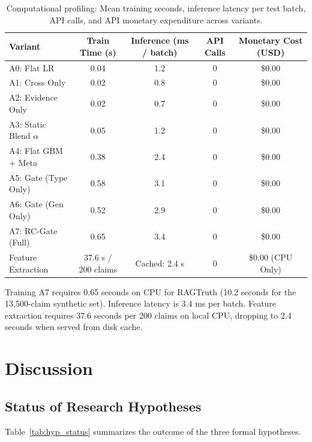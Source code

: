 \documentclass[pdflatex,sn-mathphys,Numbered]{sn-jnl}
\begin{document}
\begin{table}[htbp]
\caption{Computational profiling: Mean training seconds, inference latency per test batch, API calls, and API monetary expenditure across variants.}\label{tab:cost_profile}
\scriptsize
\setlength{\tabcolsep}{2.8pt}
\begin{tabular}{@{}lcccc@{}}
\toprule
\textbf{Variant} & \textbf{Train Time (s)} & \textbf{Inference (ms / batch)} & \textbf{API Calls} & \textbf{Monetary Cost (USD)} \\
\midrule
A0: Flat LR & 0.04 & 1.2 & 0 & \$0.00 \\
A1: Cross Only & 0.02 & 0.8 & 0 & \$0.00 \\
A2: Evidence Only & 0.02 & 0.7 & 0 & \$0.00 \\
A3: Static Blend $\alpha$ & 0.05 & 1.2 & 0 & \$0.00 \\
A4: Flat GBM + Meta & 0.38 & 2.4 & 0 & \$0.00 \\
A5: Gate (Type Only) & 0.58 & 3.1 & 0 & \$0.00 \\
A6: Gate (Gen Only) & 0.52 & 2.9 & 0 & \$0.00 \\
A7: RC-Gate (Full) & 0.65 & 3.4 & 0 & \$0.00 \\
\midrule
Feature Extraction & 37.6 s / 200 claims & Cached: 2.4 s & 0 & \$0.00 (CPU Only) \\
\bottomrule
\end{tabular}
\end{table}

Training A7 requires 0.65 seconds on CPU for RAGTruth (10.2 seconds for the 13,500-claim synthetic set). Inference latency is 3.4 ms per batch. Feature extraction requires 37.6 seconds per 200 claims on local CPU, dropping to 2.4 seconds when served from disk cache.

\section{Discussion}\label{sec:discussion}

\subsection{Status of Research Hypotheses}\label{subsec:hyp_status}

Table~\ref{tab:hyp_status} summarizes the outcome of the three formal hypotheses.
\end{document}
